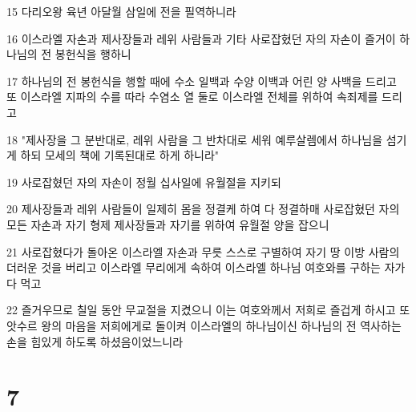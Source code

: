 \par 15 다리오왕 육년 아달월 삼일에 전을 필역하니라
\par 16 이스라엘 자손과 제사장들과 레위 사람들과 기타 사로잡혔던 자의 자손이 즐거이 하나님의 전 봉헌식을 행하니
\par 17 하나님의 전 봉헌식을 행할 때에 수소 일백과 수양 이백과 어린 양 사백을 드리고 또 이스라엘 지파의 수를 따라 수염소 열 둘로 이스라엘 전체를 위하여 속죄제를 드리고
\par 18 "제사장을 그 분반대로, 레위 사람을 그 반차대로 세워 예루살렘에서 하나님을 섬기게 하되 모세의 책에 기록된대로 하게 하니라"
\par 19 사로잡혔던 자의 자손이 정월 십사일에 유월절을 지키되
\par 20 제사장들과 레위 사람들이 일제히 몸을 정결케 하여 다 정결하매 사로잡혔던 자의 모든 자손과 자기 형제 제사장들과 자기를 위하여 유월절 양을 잡으니
\par 21 사로잡혔다가 돌아온 이스라엘 자손과 무릇 스스로 구별하여 자기 땅 이방 사람의 더러운 것을 버리고 이스라엘 무리에게 속하여 이스라엘 하나님 여호와를 구하는 자가 다 먹고
\par 22 즐거우므로 칠일 동안 무교절을 지켰으니 이는 여호와께서 저희로 즐겁게 하시고 또 앗수르 왕의 마음을 저희에게로 돌이켜 이스라엘의 하나님이신 하나님의 전 역사하는 손을 힘있게 하도록 하셨음이었느니라

\chapter{7}

